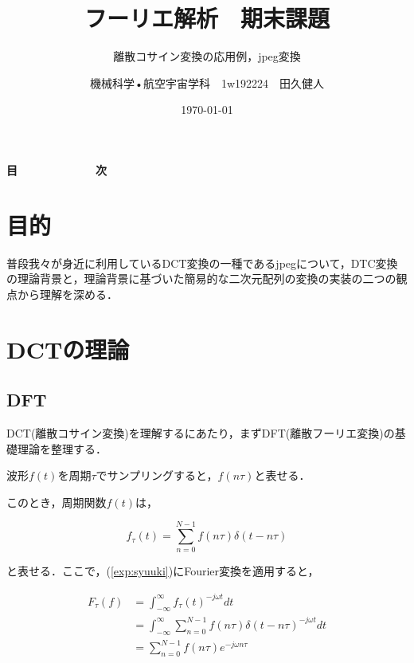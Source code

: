 \documentclass[uplatex,dvipdfmx,ja=standard]{bxjsarticle}
\title{フーリエ解析　期末課題}
\subtitle{離散コサイン変換の応用例，jpeg変換}
\author{機械科学•航空宇宙学科　1w192224　田久健人}
\date{\today}
\begin{document}
\maketitle

\thispagestyle{empty}
\vspace{2cm}

\begin{center}
    \textbf{\Large 目　　　　　　　次}  
\end{center}

\renewcommand{\contentsname}{}
\tableofcontents

\newpage
\setcounter{page}{1}

\section{目的}

普段我々が身近に利用しているDCT変換の一種であるjpegについて，DTC変換の理論背景と，理論背景に基づいた簡易的な二次元配列の変換の実装の二つの観点から理解を深める．

\section{DCTの理論}
\subsection{DFT}

DCT(離散コサイン変換)を理解するにあたり，まずDFT(離散フーリエ変換)の基礎理論を整理する．

波形$f(t)$を周期$\tau$でサンプリングすると，$f(n\tau)$と表せる．

このとき，周期関数$f(t)$は，

\begin{equation}
    \label{exp:syuuki}
    f_{\tau}(t) = \sum_{n= 0}^{N-1} f(n\tau) \delta (t - n\tau)
\end{equation}

と表せる．ここで，(\ref{exp:syuuki})にFourier変換を適用すると，

\begin{equation}
    \label{exp:foo}
    \begin{split}
        F_{\tau} (f) &= \int_{-\infty}^{\infty} f_{\tau}(t)^{-j\omega t} dt \\ 
                     &= \int_{-\infty}^{\infty} \sum_{n=0}^{N-1} f(n\tau) \delta (t - n\tau)^{- j\omega t} dt \\
                     &= \sum_{n=0}^{N-1} f(n\tau) e^{-j\omega n \tau} 
    \end{split}
\end{equation}
\end{document}
